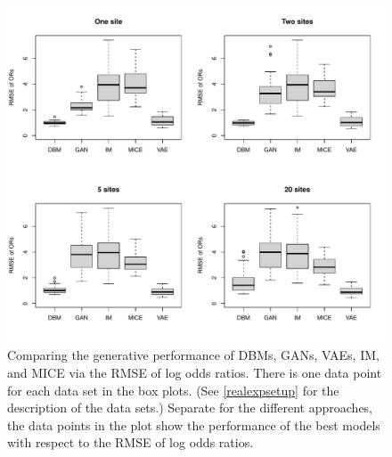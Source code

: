 \documentclass[12pt]{article}
\begin{document}
\begin{figure}[t]
   \centering
   \includegraphics[scale=0.7]{images/rmseodds.pdf}
   \caption{Comparing the generative performance of DBMs, GANs, VAEs, IM, and MICE via the RMSE of log odds ratios. There is one data point for each data set in the box plots. (See \ref{realexpsetup} for the description of the data sets.)
   Separate for the different approaches, the data points in the plot show the performance of the best models with respect to the RMSE of log odds ratios.}
   \label{fig:rmseodds}
\end{figure}
\end{document}
